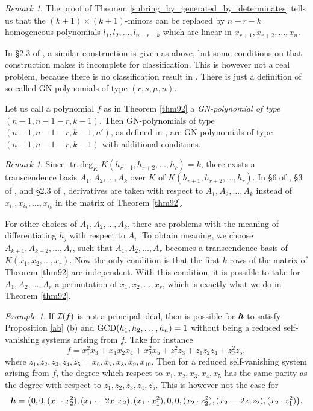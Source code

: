 \documentclass[12pt]{article}
\theoremstyle{definition}
\theoremstyle{remark}
\newtheorem{example}[theorem]{Example}
\newtheorem{remark}[theorem]{Remark}
\def\cI{{\cal I}}
\def\boldh{\mbox{\boldmath $h$}}
\def\trdeg{\operatorname{tr.\,deg}}
\begin{document}
\begin{remark}
The proof of Theorem \ref{subring_by_generated_by_determinates} tells us that
the $(k+1) \times (k+1)$-minors can be replaced by $n-r-k$ homogeneous 
polynomials $l_1, l_2, \ldots, l_{n-r-k}$ which are linear in 
$x_{r+1}, x_{r+2}, \ldots, x_n$. 

In \S 2.3 of \cite{ciliberto_russo_francesco_simis}, a similar construction is
given as above, but some conditions on that construction makes it incomplete
for classification. This is however not a real problem, because there 
is no classification result in \cite{ciliberto_russo_francesco_simis}.
There is just a definition of so-called GN-polynomials of type $(r,s,\mu,n)$.

Let us call a polynomial $f$ as in Theorem \ref{thm92} a 
\emph{GN-polynomial of type $(n-1,n-1-r,k-1)$}. Then GN-polynomials of type 
$(n-1,n-1-r,k-1,n')$, as defined in \cite{ciliberto_russo_francesco_simis},
are GN-polynomials of type $(n-1,n-1-r,k-1)$ with additional conditions.
%
\end{remark}

\begin{remark}
Since $\trdeg_K K(h_{r+1},h_{r+2},\ldots,h_r) = k$, there 
exists a transcendence basis $A_1, A_2, \ldots, A_k$ over $K$ of 
$K(h_{r+1},h_{r+2},\ldots,h_r)$.
In \S 6 of \cite{GNzzz}, \S 3 of \cite{clossen}, and \S 2.3 of 
\cite{ciliberto_russo_francesco_simis}, derivatives are taken 
with respect to $A_1, A_2, \ldots, A_k$ instead of 
$x_{i_1}, x_{i_2}, \ldots, x_{i_k}$ in the matrix of Theorem
\ref{thm92}.

For other choices of $A_1, A_2, \ldots, A_k$, there are
problems with the meaning of differentiating $h_j$ with respect to $A_i$. 
To obtain meaning, we choose $A_{k+1}, \allowbreak A_{k+2}, \ldots, A_r$, such that 
$A_1, A_2, \ldots, A_r$ becomes a transcendence basis of $K(x_1,x_2,\ldots,x_r)$.
Now the only condition is that the first $k$ rows of the matrix of Theorem
\ref{thm92} are independent. With this condition, it is possible to take
for $A_1, A_2, \ldots, A_r$ a permutation of $x_1,x_2,\ldots,x_r$, which is
exactly what we do in Theorem \ref{thm92}.
%
\end{remark}

\begin{example} \label{is_not_arising}
If $\cI(f)$ is not a principal ideal, then is possible for $\boldh$ to satisfy 
Proposition \ref{ab} (b) and ${\rm GCD}(h_1,h_2,\ldots,h_n) = 1$ without being 
a reduced self-vanishing systems arising from $f$. Take for instance
$$
f = x_1^2 x_3 + x_1 x_2 x_4 + x_2^2 x_5 + z_1^2 z_3 + z_1 z_2 z_4 + z_2^2 z_5, 
$$
where $z_1,z_2,z_3,z_4,z_5 = x_6,x_7,x_8,x_9,x_{10}$. 
Then for a reduced self-vanishing system arising from $f$, the degree 
which respect to $x_1,x_2,x_3,x_4,x_5$ has the same parity as the 
degree with respect to $z_1,z_2,z_3,z_4,z_5$. This is however not the case 
for 
$$
\boldh = \big(0,0,(x_1 \cdot x_2^2), (x_1 \cdot -2 x_1 x_2), (x_1 \cdot x_1^2),
0,0,(x_2 \cdot z_2^2), (x_2 \cdot -2 z_1 z_2), (x_2 \cdot z_1^2)\big). 
$$
%
\end{example}
\end{document}
